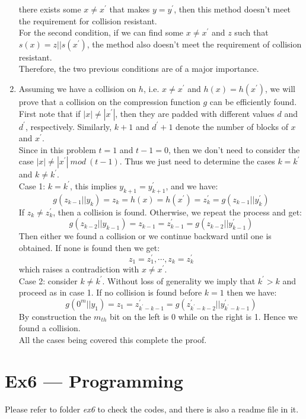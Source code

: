 \documentclass[12pt, a4paper]{article}
\begin{document}
\begin{enumerate}
          there exists some $x \neq x^\prime$ that makes $y = y^\prime$, 
          then this method doesn't meet the requirement for collision resistant.\\
          For the second condition, if we can find some $x \neq x^\prime$ and $z$ such that $s(x) = z||s(x^\prime)$, 
          the method also doesn't meet the requirement of collision resistant.\\
          Therefore, the two previous conditions are of a major importance.
    \item Assuming we have a collision on $h$, i.e. $x \neq x^\prime$ and $h(x) = h(x^\prime)$, 
          we will prove that a collision on the compression function $g$ can be efficiently found.\\
          First note that if $|x| \neq |x^\prime|$, then they are padded with different values $d$ and $d^\prime$, respectively. 
          Similarly, $k + 1$ and $d^\prime + 1$ denote the number of blocks of $x$ and $x^\prime$.\\
          Since in this problem $t = 1$ and $t - 1 = 0$, 
          then we don't need to consider the case $|x| \neq |x^\prime|\ mod\ (t - 1)$. 
          Thus we just need to determine the cases $k = k^\prime$ and $k \neq k^\prime$.\\
          Case 1: $k = k^\prime$, this implies $y_{k+1} = y_{k+1}^\prime$, and we have:
          $$g(z_{k-1}||y_k) = z_k = h(x) = h(x^\prime) = z_k^\prime = g(z_{k-1}||y_k^\prime)$$
          If $z_k \neq z_k^\prime$, then a collision is found. Otherwise, 
          we repeat the process and get:
          $$g(z_{k-2}||y_{k-1}) = z_{k-1} = z_{k-1}^\prime = g(z_{k-2}||y_{k-1}^\prime)$$
          Then either we found a collision or we continue backward until one is obtained. 
          If none is found then we get:
          $$z_1 = z_1^\prime,\cdots,z_k = z_k^\prime$$
          which raises a contradiction with $x \neq x^\prime$.\\
          Case 2: consider $k \neq k^\prime$. Without loss of generality we imply that $k^\prime > k$ and proceed as in case 1. 
          If no collision is found before $k = 1$ then we have:
          $$g(0^m||y_1) = z_1 = z_{k^\prime-k-1}^\prime = g(z_{k^\prime-k-2}^\prime||y_{k^\prime-k-1}^\prime)$$
          By construction the $m_{th}$ bit on the left is 0 while on the right is 1. Hence we found a collision.\\
          All the cases being covered this complete the proof.

\end{enumerate}

\section*{Ex6 --- Programming}
Please refer to folder \emph{ex6} to check the codes, and there is also a readme file in it.
\end{document}
